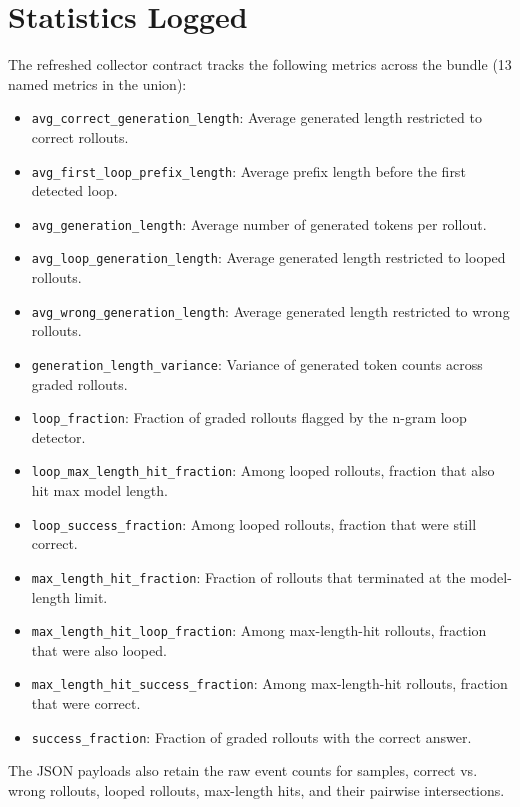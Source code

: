 \documentclass[11pt]{article}
\begin{document}
\section*{Statistics Logged}
The refreshed collector contract tracks the following metrics across the bundle (13 named metrics in the union):
\begin{itemize}[leftmargin=1.5em]
\item \texttt{avg\_correct\_generation\_length}: Average generated length restricted to correct rollouts.
\item \texttt{avg\_first\_loop\_prefix\_length}: Average prefix length before the first detected loop.
\item \texttt{avg\_generation\_length}: Average number of generated tokens per rollout.
\item \texttt{avg\_loop\_generation\_length}: Average generated length restricted to looped rollouts.
\item \texttt{avg\_wrong\_generation\_length}: Average generated length restricted to wrong rollouts.
\item \texttt{generation\_length\_variance}: Variance of generated token counts across graded rollouts.
\item \texttt{loop\_fraction}: Fraction of graded rollouts flagged by the n-gram loop detector.
\item \texttt{loop\_max\_length\_hit\_fraction}: Among looped rollouts, fraction that also hit max model length.
\item \texttt{loop\_success\_fraction}: Among looped rollouts, fraction that were still correct.
\item \texttt{max\_length\_hit\_fraction}: Fraction of rollouts that terminated at the model-length limit.
\item \texttt{max\_length\_hit\_loop\_fraction}: Among max-length-hit rollouts, fraction that were also looped.
\item \texttt{max\_length\_hit\_success\_fraction}: Among max-length-hit rollouts, fraction that were correct.
\item \texttt{success\_fraction}: Fraction of graded rollouts with the correct answer.
\end{itemize}

The JSON payloads also retain the raw event counts for samples, correct vs. wrong rollouts, looped rollouts, max-length hits, and their pairwise intersections.
\end{document}
